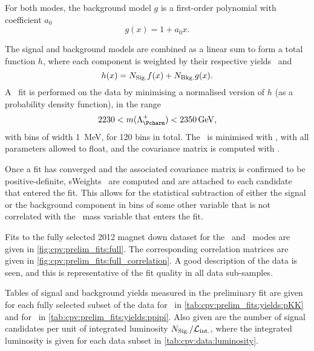 For both modes, the background model $g$ is a first-order polynomial with 
coefficient $a_{0}$
\begin{equation}
  g(x) = 1 + a_{0}x.
  \label{eqn:prelim_fits:bkg_model}
\end{equation}

The signal and background models are combined as a linear sum to form a total 
function $h$, where each component is weighted by their respective yields 
\nsig\ and \nbkg
\begin{equation}
  h(x) = N_{\text{Sig.}} f(x) + N_{\text{Bkg.}} g(x).
\end{equation}
A \chisq\ fit is performed on the data by minimising a normalised version of 
$h$ (as a probability density function), in the range
\begin{equation}
  2230 < m(\PLambdac) < \SI{2350}{\GeV},
\end{equation}
with bins of width \SI{1}{\MeV}, for 120 bins in total.
The \chisq\ is minimised with \minuit, with all parameters allowed to float, 
and the covariance matrix is computed with \hesse.

Once a fit has converged and the associated covariance matrix is confirmed to 
be positive-definite, sWeights~\cite{Pivk:2004ty} are computed and are attached 
to each candidate that entered the fit.
This allows for the statistical subtraction of either the signal or the 
background component in bins of some other variable that is not correlated with 
the \PLambdac\ mass variable that enters the fit.

Fits to the fully selected 2012 magnet down dataset for the \pKK\ and \ppipi\ 
modes are given in \cref{fig:cpv:prelim_fits:full}.
The corresponding correlation matrices are given in 
\cref{fig:cpv:prelim_fits:full_correlation}.
A good description of the data is seen, and this is representative of the fit 
quality in all data sub-samples.

Tables of signal and background yields measured in the preliminary fit are 
given for each fully selected subset of the data for \pKK\ in 
\cref{tab:cpv:prelim_fits:yields:pKK} and for \ppipi\ in 
\cref{tab:cpv:prelim_fits:yields:ppipi}.
Also given are the number of signal candidates per unit of integrated 
luminosity $N_{\text{Sig.}}/\mathcal{L}_{\textnormal{int.}}$, where the integrated luminosity is given for each 
data subset in \cref{tab:cpv:data:luminosity}.

